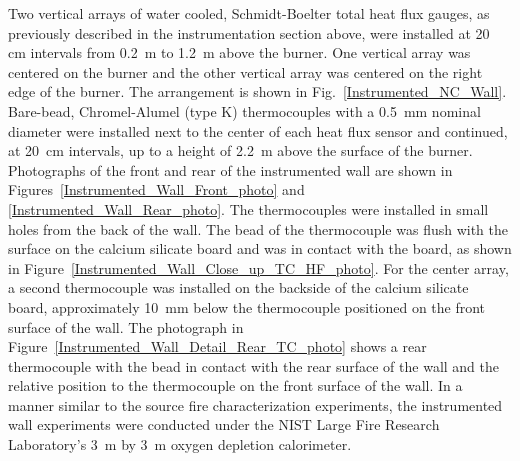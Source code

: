 \documentclass[twoside]{uocthesis}
\begin{document}
{Two vertical arrays of water cooled, Schmidt-Boelter total heat flux gauges, as previously described in the instrumentation section above, were installed at 20 cm intervals from 0.2~m to 1.2~m above the burner.  One vertical array was centered on the burner and the other vertical array was centered on the right edge of the burner. The arrangement is shown in Fig.~\ref{Instrumented_NC_Wall}. Bare-bead, Chromel-Alumel (type K) thermocouples with a 0.5~mm nominal diameter were installed next to the center of each heat flux sensor and continued, at 20~cm intervals, up to a height of 2.2~m above the surface of the burner. Photographs of the front and rear of the instrumented wall are shown in Figures~\ref{Instrumented_Wall_Front_photo} and \ref{Instrumented_Wall_Rear_photo}. The thermocouples were installed in small holes from the back of the wall.  The bead of the thermocouple was flush with the surface on the calcium silicate board and was in contact with the board, as shown in Figure~\ref{Instrumented_Wall_Close_up_TC_HF_photo}.  For the center array, a second thermocouple was installed on the backside of the calcium silicate board, approximately 10~mm below the thermocouple positioned on the front surface of the wall. The photograph in Figure~\ref{Instrumented_Wall_Detail_Rear_TC_photo} shows a rear thermocouple with the bead in contact with the rear surface of the wall and the relative position to the thermocouple on the front surface of the wall. In a manner similar to the source fire characterization experiments, the instrumented wall experiments were conducted under the NIST Large Fire Research Laboratory's 3~m by 3~m oxygen depletion calorimeter.

}
\end{document}
